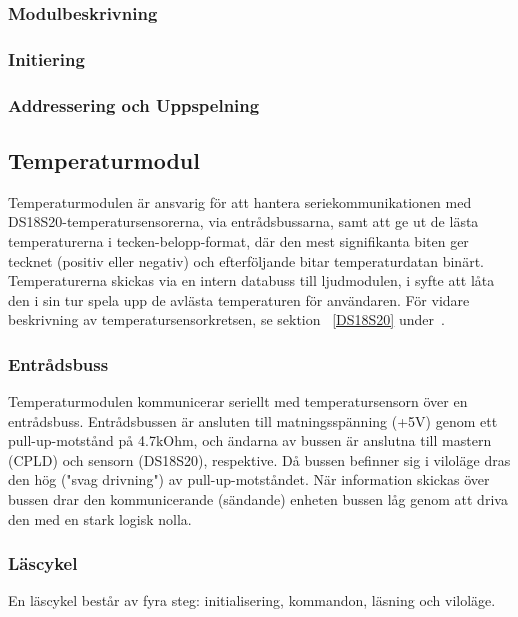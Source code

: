 \documentclass[a4paper,11pt]{article}
\begin{document}
		\subsubsection{Modulbeskrivning}

		\subsubsection{Initiering}

		\subsubsection{Addressering och Uppspelning}

	\subsection{Temperaturmodul}

	Temperaturmodulen är ansvarig för att hantera seriekommunikationen med 
	DS18S20-temperatursensorerna, via entrådsbussarna, samt att ge ut de lästa temperaturerna
	i tecken-belopp-format, där den mest signifikanta biten ger tecknet (positiv eller negativ) och efterföljande bitar temperaturdatan binärt.
	Temperaturerna skickas via en intern databuss till ljudmodulen, i syfte att låta den i sin tur spela upp de avlästa temperaturen för användaren. 
	För vidare beskrivning av temperatursensorkretsen, se sektion ~\ref{DS18S20} under~.

	\subsubsection{Entrådsbuss}

	Temperaturmodulen kommunicerar seriellt med temperatursensorn över en entrådsbuss.
	Entrådsbussen är ansluten till matningsspänning (+5V) genom ett pull-up-motstånd på 4.7kOhm, och
	ändarna av bussen är anslutna till mastern (CPLD) och sensorn (DS18S20), respektive. Då bussen
	befinner sig i viloläge dras den hög ("svag drivning") av pull-up-motståndet. När information
	skickas över bussen drar den kommunicerande (sändande) enheten bussen låg genom att driva den
	med en stark logisk nolla.

	\subsubsection{Läscykel}

	En läscykel består av fyra steg: initialisering, kommandon, läsning och viloläge.
\end{document}
